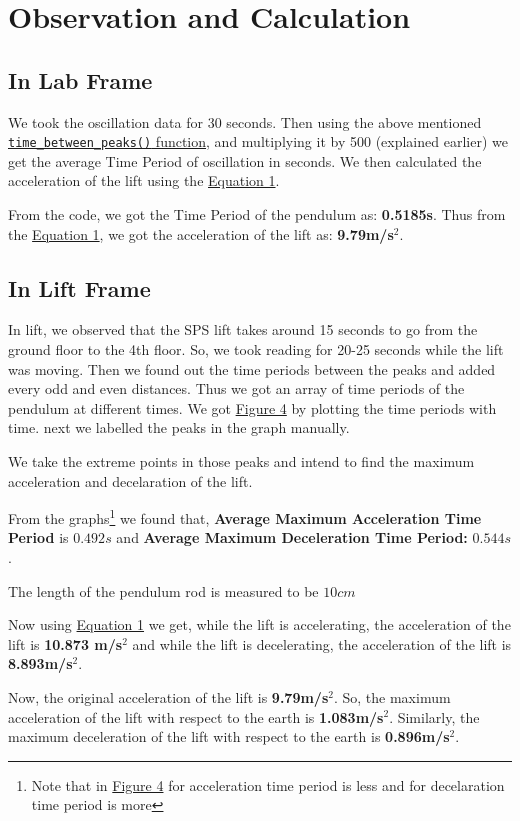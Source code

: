 \section{Observation and Calculation}

	\subsection{In Lab Frame}
		We took the oscillation data for 30 seconds. Then using the above mentioned \hyperref[code:time_period]{\texttt{time\_between\_peaks()} function}, and multiplying it by 500 (explained earlier) we get the average Time Period of oscillation in seconds. We then calculated the acceleration of the lift using the \hyperref[eq:1]{Equation 1}. 

		From the code, we got the Time Period of the pendulum as: \textbf{0.5185s}. Thus from the \hyperref[eq:1]{Equation 1}, we got the acceleration of the lift as: \textbf{9.79m/s$^2$}.

	\subsection{In Lift Frame}
		In lift, we observed that the SPS lift takes around 15 seconds to go from the ground floor to the 4th floor. So, we took reading for 20-25 seconds while the lift was moving. Then we found out the time periods between the peaks and added every odd and even distances. Thus we got an array of time periods of the pendulum at different times. We got \hyperref[th:4]{Figure 4} by plotting the time periods with time. next we labelled the peaks in the graph manually.

		We take the extreme points in those peaks and intend to find the maximum acceleration and decelaration of the lift.

		From the graphs\footnote{Note that in \hyperref[th:4]{Figure 4} for acceleration time period is less and for decelaration time period is more} we found that, \textbf{Average Maximum Acceleration Time Period} is $0.492s$ and \textbf{Average Maximum Deceleration Time Period:} $0.544s$.

		The length of the pendulum rod is measured to be $10cm$
		
		Now using \hyperref[eq:1]{Equation 1} we get, while the lift is accelerating, the acceleration of the lift is \textbf{10.873 m/s$^2$} and while the lift is decelerating, the acceleration of the lift is \textbf{8.893m/s$^2$}.

		Now, the original acceleration of the lift is \textbf{9.79m/s$^2$}. So, the maximum acceleration of the lift with respect to the earth is \textbf{1.083m/s$^2$}. Similarly, the maximum deceleration of the lift with respect to the earth is \textbf{0.896m/s$^2$}.